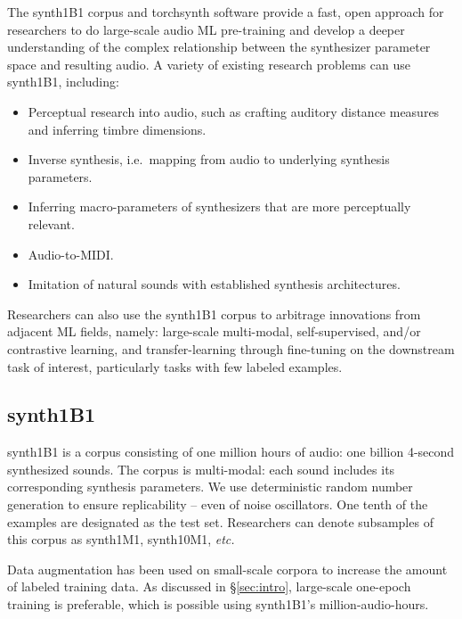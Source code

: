 The synth1B1 corpus and torchsynth software provide a fast, open approach for researchers to do large-scale audio ML pre-training and develop a deeper understanding of the complex relationship between the synthesizer parameter space and resulting audio.
A variety of existing research problems can use synth1B1, including:
\begin{itemize}
\item Perceptual research into audio, such as crafting auditory distance measures and inferring timbre dimensions. \cite{vahidi2020timbre}
\item Inverse synthesis, i.e.\ mapping from audio to underlying synthesis parameters.
\cite{yee2018automatic,esling2020flow}
\item Inferring macro-parameters of synthesizers that are more perceptually relevant. \cite{esling2020flow, tatar2021latent}
\item Audio-to-MIDI. \cite{47659}
\item Imitation of natural sounds with established synthesis architectures.
\end{itemize}
Researchers can also use the synth1B1 corpus to arbitrage innovations from adjacent ML fields, namely: large-scale multi-modal, self-supervised, and/or contrastive learning, and transfer-learning through fine-tuning on the downstream task of interest, particularly tasks with few labeled examples.

\subsection{synth1B1}
\label{section:synth1B1}

synth1B1 is a corpus consisting of one million hours of audio: one billion 4-second synthesized sounds. The corpus is multi-modal: each sound includes its corresponding synthesis parameters. We use deterministic random number generation to ensure replicability -- even of noise oscillators. One tenth of the examples are designated as the test set. Researchers can denote subsamples of this corpus as synth1M1, synth10M1, {\em etc.} %

Data augmentation has been used on small-scale corpora to increase the amount of labeled training data. As discussed in \S\ref{sec:intro}, large-scale one-epoch training is preferable, which is possible using synth1B1's million-audio-hours.

